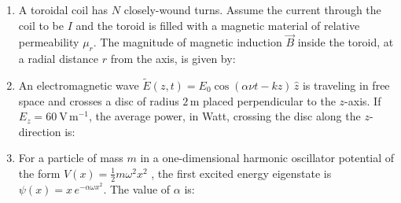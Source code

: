 \documentclass[journal,13pt,onecolumn]{IEEEtran}
\begin{document}
\begin{enumerate}[itemsep = 1em]
\item A toroidal coil has $N$ closely-wound turns. Assume the current through the coil to be $I$ and the toroid is filled with a magnetic material of relative permeability $\mu_{r}$. The magnitude of magnetic induction $\vec{B}$ inside the toroid, at a radial distance $r$ from the axis, is given by:

\hfill{}

\begin{enumerate}
\end{enumerate}

\item An electromagnetic wave $\tilde{E}(z,t) = E_{0} \cos(\alpha \nu t - kz) \, \hat{z}$ is traveling in free space and crosses a disc of radius $2\,\text{m}$ placed perpendicular to the $z$-axis. If $E_{z} = 60 \ \mathrm{V \, m^{-1}}$, the average power, in Watt, crossing the disc along the $z$-direction is:

\hfill{}

\begin{enumerate}
\end{enumerate}

\item For a particle of mass $m$ in a one-dimensional harmonic oscillator potential of the form  $V(x) = \frac{1}{2} m \omega^{2} x^{2}$ , the first excited energy eigenstate is $\psi(x) = x \, e^{ -\alpha \omega x^{2} }$. The value of $\alpha$ is:

\hfill{}

\begin{enumerate}
\end{enumerate}


\end{enumerate}
\end{document}
